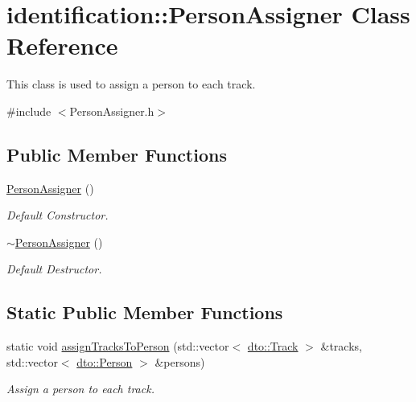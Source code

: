 \hypertarget{classidentification_1_1_person_assigner}{}\section{identification\+:\+:Person\+Assigner Class Reference}
\label{classidentification_1_1_person_assigner}


This class is used to assign a person to each track.  




{\ttfamily \#include $<$Person\+Assigner.\+h$>$}

\subsection*{Public Member Functions}
\begin{DoxyCompactItemize}
\item 
\mbox{\label{classidentification_1_1_person_assigner_a248ba9741dc23cc6f299e75e7d3c3717}} 
\mbox{\hyperlink{classidentification_1_1_person_assigner_a248ba9741dc23cc6f299e75e7d3c3717}{Person\+Assigner}} ()
\begin{DoxyCompactList}\small\item\em Default Constructor. \end{DoxyCompactList}\item 
\mbox{\label{classidentification_1_1_person_assigner_ad0e417d3f80379e3820a05e6a02f5c1c}} 
\mbox{\hyperlink{classidentification_1_1_person_assigner_ad0e417d3f80379e3820a05e6a02f5c1c}{$\sim$\+Person\+Assigner}} ()
\begin{DoxyCompactList}\small\item\em Default Destructor. \end{DoxyCompactList}\end{DoxyCompactItemize}
\subsection*{Static Public Member Functions}
\begin{DoxyCompactItemize}
\item 
\mbox{\label{classidentification_1_1_person_assigner_ad734fa2fccc224d833733f4e2a7fc9e3}} 
static void \mbox{\hyperlink{classidentification_1_1_person_assigner_ad734fa2fccc224d833733f4e2a7fc9e3}{assign\+Tracks\+To\+Person}} (std\+::vector$<$ \mbox{\hyperlink{structdto_1_1_track}{dto\+::\+Track}} $>$ \&tracks, std\+::vector$<$ \mbox{\hyperlink{structdto_1_1_person}{dto\+::\+Person}} $>$ \&persons)
\begin{DoxyCompactList}\small\item\em Assign a person to each track. \end{DoxyCompactList}\end{DoxyCompactItemize}


